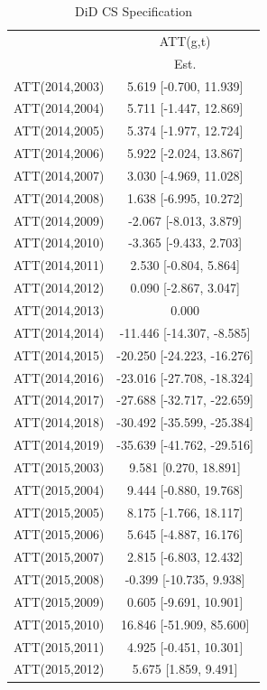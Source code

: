 \documentclass[
  12pt,
]{article}
\begin{document}
\begin{table}

\caption{\label{tab:Tab-6}DiD CS Specification}
\centering
\fontsize{6}{8}\selectfont
\begin{tabular}[t]{lc}
\toprule
\multicolumn{1}{c}{ } & \multicolumn{1}{c}{ATT(g,t)} \\
\cmidrule(l{3pt}r{3pt}){2-2}
  & Est.\\
\midrule
ATT(2014,2003) & 5.619 [-0.700, 11.939]\\
ATT(2014,2004) & 5.711 [-1.447, 12.869]\\
ATT(2014,2005) & 5.374 [-1.977, 12.724]\\
ATT(2014,2006) & 5.922 [-2.024, 13.867]\\
ATT(2014,2007) & 3.030 [-4.969, 11.028]\\
ATT(2014,2008) & 1.638 [-6.995, 10.272]\\
ATT(2014,2009) & -2.067 [-8.013, 3.879]\\
ATT(2014,2010) & -3.365 [-9.433, 2.703]\\
ATT(2014,2011) & 2.530 [-0.804, 5.864]\\
ATT(2014,2012) & 0.090 [-2.867, 3.047]\\
ATT(2014,2013) & 0.000\\
ATT(2014,2014) & -11.446 [-14.307, -8.585]\\
ATT(2014,2015) & -20.250 [-24.223, -16.276]\\
ATT(2014,2016) & -23.016 [-27.708, -18.324]\\
ATT(2014,2017) & -27.688 [-32.717, -22.659]\\
ATT(2014,2018) & -30.492 [-35.599, -25.384]\\
ATT(2014,2019) & -35.639 [-41.762, -29.516]\\
ATT(2015,2003) & 9.581 [0.270, 18.891]\\
ATT(2015,2004) & 9.444 [-0.880, 19.768]\\
ATT(2015,2005) & 8.175 [-1.766, 18.117]\\
ATT(2015,2006) & 5.645 [-4.887, 16.176]\\
ATT(2015,2007) & 2.815 [-6.803, 12.432]\\
ATT(2015,2008) & -0.399 [-10.735, 9.938]\\
ATT(2015,2009) & 0.605 [-9.691, 10.901]\\
ATT(2015,2010) & 16.846 [-51.909, 85.600]\\
ATT(2015,2011) & 4.925 [-0.451, 10.301]\\
ATT(2015,2012) & 5.675 [1.859, 9.491]\\

\end{tabular}
\end{table}
\end{document}
